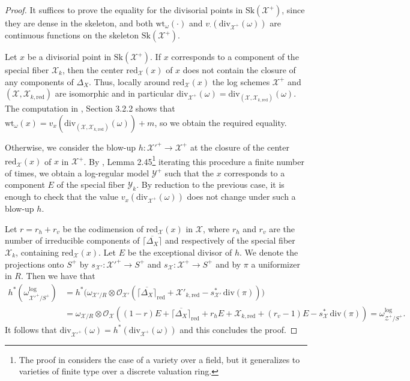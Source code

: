 \documentclass{amsart}%
\numberwithin{equation}{subsection}
\theoremstyle{plain2}
\theoremstyle{definition2}
\theoremstyle{stepstyle}
\theoremstyle{point}
\theoremstyle{subpoint}
\newcommand{\cX}{\ensuremath{\mathscr{X}}}
\newcommand{\caO}{\ensuremath{\mathcal{O}}}
\newcommand{\cY}{\ensuremath{\mathscr{Y}}}
\newcommand{\cZ}{\ensuremath{\mathscr{Z}}}
\renewcommand{\cY}{\ensuremath{\mathscr{Y}}}
\newcommand{\redu}{\mathrm{red}}
\newcommand{\divisor}{\mathrm{div}}
\newcommand{\weight}{\mathrm{wt}}
\newcommand{\Sk}{\mathrm{Sk}}
\begin{document}
\begin{proof}
It suffices to prove the equality for the divisorial points in $\Sk(\cX^+)$, since they are dense in the skeleton, and both $\weight_{\omega}(\cdot)$ and $v_{\cdot}(\divisor_{\cX^+}(\omega))$ are continuous functions on the skeleton $\Sk(\cX^+)$.

Let $x$ be a divisorial point in $\Sk(\cX^+)$. If $x$ corresponds to a component of the special fiber $\cX_k$, then the center $\redu_{\cX}(x)$ of $x$ does not contain the closure of any components of $\Delta_X$. Thus, locally around $\redu_{\cX}(x)$ the log schemes $\cX^+$ and $(\cX,\cX_{k,\redu})$ are isomorphic and in particular $\divisor_{\cX^+}(\omega)=\divisor_{(\cX,\cX_{k,\redu})}(\omega)$. The computation in \cite{NicaiseXu}, Section 3.2.2 shows that $\weight_{\omega}(x)= v_x(\divisor_{(\cX,\cX_{k,\redu})}(\omega)) +m$, so we obtain the required equality.

Otherwise, we consider the blow-up $h: \cX'^+ \rightarrow \cX^+$ at the closure of the center $\redu_{\cX}(x)$ of $x$ in $\cX^+$. By \cite{KollarMori}, Lemma 2.45\footnote{The proof in \cite{KollarMori} considers the case of a variety over a field, but it generalizes to varieties of finite type over a discrete valuation ring.} iterating this procedure a finite number of times, we obtain a log-regular model $\cY^+$ such that the $x$ corresponds to a component $E$ of the special fiber $\cY_k$. By reduction to the previous case, it is enough to check that the value $v_x(\divisor_{\cX^+}(\omega))$ does not change under such a blow-up $h$.

Let  $r=r_h +r_v$ be the codimension of $\redu_{\cX}(x)$ in $\cX$, where $r_h$ and $r_v$ are the number of irreducible components of $\overline{\lceil\Delta_X \rceil}$ and respectively of the special fiber $\cX_k$, containing $\redu_{\cX}(x)$. Let $E$ be the exceptional divisor of $h$. We denote the projections onto $S^+$ by $s_{\cX'}:\cX'^+\rightarrow S^+$ and $s_{\cX}:\cX^+ \rightarrow S^+$ and by $\pi$ a uniformizer in $R$. Then we have that
\begin{align*}
h^*(\omega^{\log}_{\cX'^+/S^+})& = h^* \big(\omega_{\cX'/R} \otimes \caO_{\cX'}(\overline{\lceil\Delta_X \rceil}_{\redu} + \cX'_{k,\redu} - s_{\cX'}^*\, \divisor(\pi)) \big) \\
& = \omega_{\cX/R}\otimes \caO_{\cX}((1-r)E +\overline{\lceil\Delta_X \rceil}_{\redu} + r_hE+ \cX_{k,\redu} + (r_v-1)E - s_\cX^*\,\divisor(\pi))= \omega^{\log}_{\cZ^+/S^+}.
\end{align*} It follows that $\divisor_{\cX'^+}(\omega)=h^*(\divisor_{\cX^+}(\omega))$ and this concludes the proof.
\end{proof}
\end{document}
